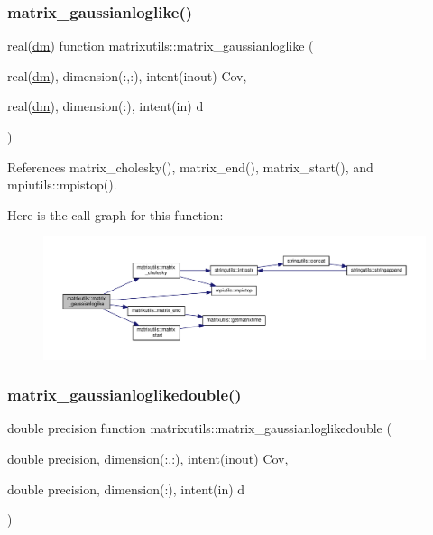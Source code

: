 \subsubsection{\texorpdfstring{matrix\+\_\+gaussianloglike()}{matrix\_gaussianloglike()}}
{\footnotesize\ttfamily real(\mbox{\hyperlink{namespacematrixutils_a7bdc564986ea4d90f51201c75606ef3d}{dm}}) function matrixutils\+::matrix\+\_\+gaussianloglike (\begin{DoxyParamCaption}\item[{real(\mbox{\hyperlink{namespacematrixutils_a7bdc564986ea4d90f51201c75606ef3d}{dm}}), dimension(\+:,\+:), intent(inout)}]{Cov,  }\item[{real(\mbox{\hyperlink{namespacematrixutils_a7bdc564986ea4d90f51201c75606ef3d}{dm}}), dimension(\+:), intent(in)}]{d }\end{DoxyParamCaption})}



References matrix\+\_\+cholesky(), matrix\+\_\+end(), matrix\+\_\+start(), and mpiutils\+::mpistop().

Here is the call graph for this function\+:
\nopagebreak
\begin{figure}[H]
\begin{center}
\leavevmode
\includegraphics[width=350pt]{namespacematrixutils_a5a3ede7fff09728b5cacb5a559ab936f_cgraph}
\end{center}
\end{figure}
\mbox{\label{namespacematrixutils_ab48ad701f7ef749e5bea654c83ac4544}} 
\subsubsection{\texorpdfstring{matrix\+\_\+gaussianloglikedouble()}{matrix\_gaussianloglikedouble()}}
{\footnotesize\ttfamily double precision function matrixutils\+::matrix\+\_\+gaussianloglikedouble (\begin{DoxyParamCaption}\item[{double precision, dimension(\+:,\+:), intent(inout)}]{Cov,  }\item[{double precision, dimension(\+:), intent(in)}]{d }\end{DoxyParamCaption})}



